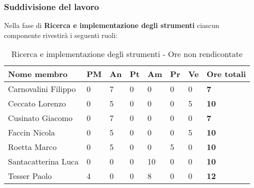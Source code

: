 		\subsubsection{Suddivisione del lavoro} %
		\label{ssub:suddivisione_del_lavoro}
		Nella fase di \textbf{Ricerca e implementazione degli strumenti} ciascun componente rivestirà i seguenti ruoli: \\
			\begin{table}[!h]
				\begin{center}
					\begin{tabularx}{0.9\textwidth}{|l|l|l|l|l|l|l|X|}
						\hline
						\textbf{Nome membro} & \textbf{PM} & \textbf{An} & \textbf{Pt} & \textbf{Am} & \textbf{Pr} & \textbf{Ve} & \textbf{Ore totali} \\
						\hline
						Carnovalini Filippo & 0 & 7 & 0 & 0 & 0 & 0 & \textbf{7} \\
						\hline
						Ceccato Lorenzo & 0 & 5 & 0 & 0 & 0 & 5 & \textbf{10} \\
						\hline
						Cusinato Giacomo & 0 & 7 & 0 & 0 & 0 & 0 & \textbf{7} \\
						\hline
						Faccin Nicola & 0 & 5 & 0 & 0 & 0 & 5 & \textbf{10} \\
						\hline
						Roetta Marco & 0 & 5 & 0 & 0 & 5 & 0 & \textbf{10} \\
						\hline
						Santacatterina Luca & 0 & 0 & 0 & 10 & 0 & 0 & \textbf{10} \\
						\hline
						Tesser Paolo & 4 & 0 & 0 & 8 & 0 & 0 & \textbf{12} \\
						\hline
					\end{tabularx}
				\end{center}
			\caption{Ricerca e implementazione degli strumenti - Ore non rendicontate}
			\end{table}
		
